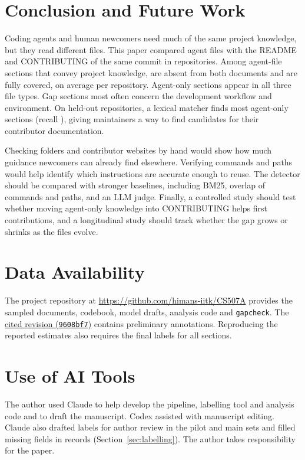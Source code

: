 \documentclass[sigconf,nonacm]{acmart}
\begin{document}
\section{Conclusion and Future Work}\label{sec:conclusion}

Coding agents and human newcomers need much of the same project knowledge, but they read different
files. This paper compared agent files with the README and CONTRIBUTING of the same commit in
\nSampleRepos{} repositories. Among agent-file sections that convey project knowledge,
\agentOnlyOverall{} are absent from both documents and \sharedOverall{} are fully covered, on
average per repository. Agent-only sections appear in all three file types. Gap sections most
often concern the development workflow and environment. On held-out repositories, a lexical
matcher finds most agent-only sections (recall \detectorRecall), giving maintainers a way to find
candidates for their contributor documentation.

Checking  folders and contributor websites by hand would show how much guidance
newcomers can already find elsewhere. Verifying commands and paths would help identify which
instructions are accurate enough to reuse. The detector should be compared with stronger
baselines, including BM25, overlap of commands and paths, and an LLM judge. Finally, a controlled
study should test whether moving agent-only knowledge into CONTRIBUTING helps first contributions,
and a longitudinal study should track whether the gap grows or shrinks as the files evolve.

\section*{Data Availability}
The project repository at \url{https://github.com/himans-iitk/CS507A} provides the sampled
documents, codebook, model drafts, analysis code and \texttt{gapcheck}.
The \href{https://github.com/himans-iitk/CS507A/tree/9608bf7c491c2597d65c8cc73b9326db514360b9}{cited revision
(\texttt{9608bf7})} contains preliminary annotations. Reproducing the reported estimates also
requires the final labels for all \nCodedUnits{} sections.

\section*{Use of AI Tools}
The author used Claude to help develop the pipeline, labelling tool and analysis code and to draft
the manuscript. Codex assisted with manuscript editing. Claude also drafted labels for author
review in the pilot and main sets and filled missing fields in \nAiFilled{} records
(Section~\ref{sec:labelling}). The author takes responsibility for the paper.



\end{document}

